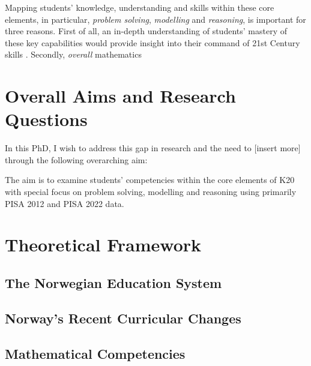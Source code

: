\documentclass[
    a4paper,                %
    11pt,                   %
    stu,                    %
    donotrepeattitle,       %
    floatsintext,           %
    biblatex,               %
    colorlinks=true,        %
    linkcolor=red,          %
    anchorcolor=black,      %
    citecolor=blue,         %
    urlcolor=blue,          %
    bookmarks=true,         %
    bookmarksopen=false,    %
    bookmarksnumbered=true, %
    dvipsnames              %
]{apa7}
\begin{document}
Mapping students' knowledge, understanding and skills within these core elements, in particular, \emph{problem solving}, \emph{modelling} and \emph{reasoning}, is important for three reasons. First of all, an in-depth understanding of students' mastery of these key capabilities would provide insight into their command of 21st Century skills \parencite[][p. 31]{oecd:2018}. Secondly, \parencite{pettersen:2018,pettersen:2019} \emph{overall} mathematics


\section{Overall Aims and Research Questions}

In this PhD, I wish to address this gap in research and the need to [insert more] through the following overarching aim:

The aim is to examine students' competencies within the core elements of K20 with special focus on problem solving, modelling and reasoning using primarily PISA 2012 and PISA 2022 data.



\section{Theoretical Framework}


\subsection{The Norwegian Education System}

\subsection{Norway's Recent Curricular Changes}

\subsection{Mathematical Competencies}
\end{document}
